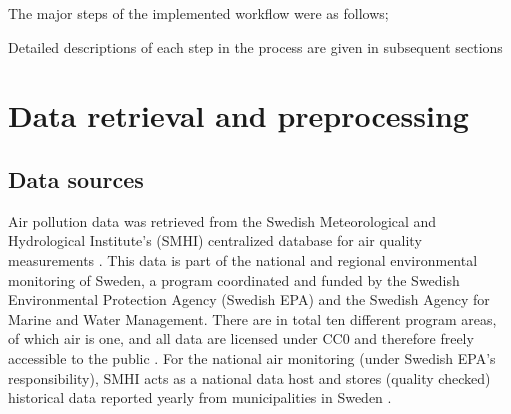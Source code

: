 The major steps of the implemented workflow were as follows; 

Detailed descriptions of each step in the process are given in subsequent sections



\section{Data retrieval and preprocessing}
\label{chap:dataprocesschap}

\subsection{Data sources}
\label{sec:data-sources}

Air pollution data was retrieved from the Swedish Meteorological and Hydrological Institute's (SMHI) centralized database for air quality measurements \cite{smhi-luftmatningar}. This data is part of the national and regional environmental monitoring of Sweden, a program coordinated and funded by the Swedish Environmental Protection Agency (Swedish EPA) and the Swedish Agency for Marine and Water Management. There are in total ten different program areas, of which air is one, and all data are licensed under CC0 and therefore freely accessible to the public \cite{naturvardsverket-miljodata}. For the national air monitoring (under Swedish EPA's responsibility), SMHI acts as a national data host and stores (quality checked) historical data reported yearly from municipalities in Sweden \cite{smhi-luftmatningar}.

